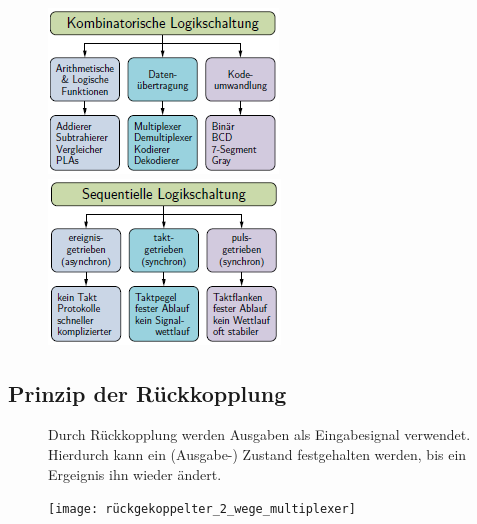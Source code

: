 \documentclass[12pt]{report}
\begin{document}
\begin{figure}[H]
  \begin{minipage}[t]{0.45\textwidth}
    \includegraphics[width=\textwidth]{kombinatorische_logikschaltung}
  \end{minipage}
  \hfill
  \begin{minipage}[t]{0.45\textwidth}
    \includegraphics[width=\textwidth]{sequentielle_logikschaltung}
  \end{minipage}
\end{figure}

\subsection{Prinzip der Rückkopplung}
\begin{defbox}[Rückkopplung]
  \begin{figure}[H]
    \begin{minipage}[t]{0.7\textwidth}
      Durch Rückkopplung werden Ausgaben als Eingabesignal verwendet. 
      Hierdurch kann ein (Ausgabe-) Zustand festgehalten werden, 
      bis ein Ergeignis ihn wieder ändert.
    \end{minipage}
    \hfill
    \begin{minipage}[t]{0.25\textwidth}
      \texttt{[image: rückgekoppelter\_2\_wege\_multiplexer]}
    \end{minipage}
  \end{figure}
\end{defbox}
\end{document}
